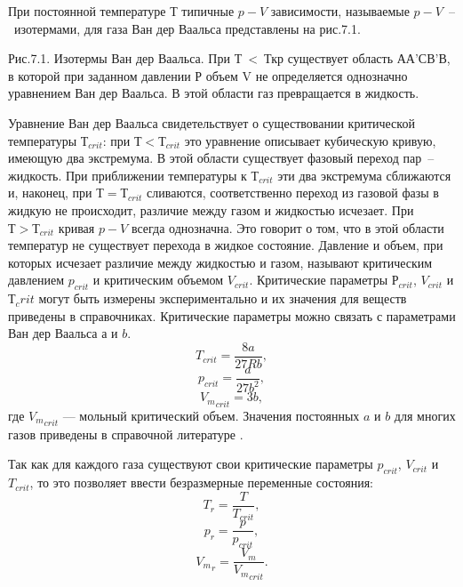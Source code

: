 При постоянной температуре $Т$ типичные $p-V$ зависимости, называемые $p-V$~--~изотермами, для газа Ван дер Ваальса представлены на рис.7.1. 


Рис.7.1. Изотермы Ван дер Ваальса. При Т < Ткр существует область АА'СВ’В, в которой при заданном давлении Р объем V не определяется однозначно уравнением Ван дер Ваальса. В этой области газ превращается в жидкость.


Уравнение Ван дер Ваальса свидетельствует о существовании критической температуры $Т_{crit}$: при $Т < Т_{crit}$ это уравнение описывает кубическую кривую, имеющую два экстремума. В этой области существует фазовый переход пар~-- жидкость. При приближении температуры к $Т_{crit}$ эти два экстремума сближаются и, наконец, при $Т = Т_{crit}$ сливаются, соответственно переход из газовой фазы в жидкую не происходит, различие между газом и жидкостью исчезает.
При $Т > Т_{crit}$ кривая $p-V$ всегда однозначна. Это говорит о том, что в этой области температур не существует перехода в жидкое состояние. Давление и объем, при которых исчезает различие между жидкостью и газом, называют критическим давлением $p_{crit}$ и критическим объемом $V_{crit}$. Критические параметры $Р_{crit}$, $V_{crit}$ и $Т_crit$ могут быть измерены экспериментально и их значения для веществ приведены в справочниках. Критические параметры можно связать с параметрами Ван дер Ваальса $а$ и $b$. 
\begin{equation}
	T_{crit}=\dfrac{8 a}{27 R b},
\end{equation}
\begin{equation}
	p_{crit}=\dfrac{a}{27 b^2},
\end{equation}
\begin{equation}
	{V_m}_{crit}=3 b,
\end{equation}
где ${V_m}_{crit}$ --- мольный критический объем. Значения постоянных $a$ и $b$ для многих газов приведены в справочной литературе \cite{rid1982}.

Так как для каждого газа существуют свои критические параметры $p_{crit}$, $V_{crit}$ и $T_{crit}$, то это позволяет ввести безразмерные переменные состояния:
\begin{equation}
	T_{r}=\dfrac{T}{T_{crit}},
\end{equation}
\begin{equation}
	p_{r}=\dfrac{p}{p_{crit}},
\end{equation}
\begin{equation}
	{V_m}_{r}=\dfrac{V_m}{{V_m}_{crit}}.
\end{equation}

